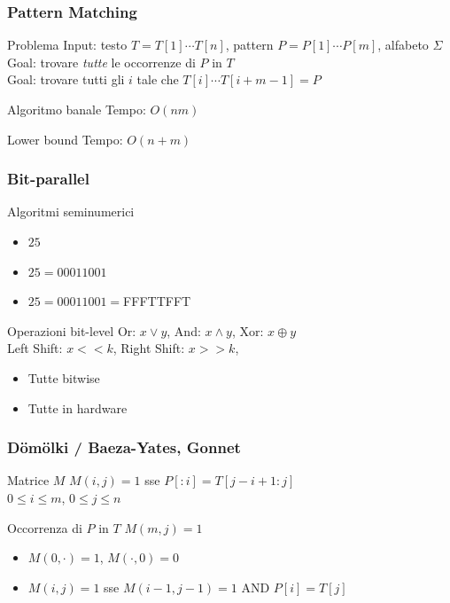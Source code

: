 \begin{frame}[fragile]
\frametitle{Pattern Matching}
\begin{block}{Problema}
\alert{Input}: testo $T=T[1]\cdots T[n]$, pattern $P=P[1]\cdots P[m]$, alfabeto $\Sigma$\\
\alert{Goal}: trovare \emph{tutte} le occorrenze di $P$ in $T$\\
\alert{Goal}: trovare tutti gli $i$ tale che $T[i]\cdots T[i+m-1]=P$
\end{block}
\begin{block}{Algoritmo banale}
\alert{Tempo}: $O(nm)$
\end{block}
\begin{block}{Lower bound}
\alert{Tempo}: $O(n+m)$
\end{block}
\end{frame}

\begin{frame}
\frametitle{Bit-parallel}
\begin{block}{Algoritmi seminumerici}
\begin{itemize}
\item
$25$
\item
$25=00011001$
\item
$25=00011001=$FFFTTFFT
\end{itemize}
\end{block}
\begin{block}{Operazioni bit-level}
\alert{Or}: $x\lor y$, \alert{And}: $x\land y$, \alert{Xor}: $x\oplus y$\\
\alert{Left Shift}: $x << k$, \alert{Right Shift}: $x >> k$,
\begin{itemize}
\item
Tutte bitwise
\item
Tutte in hardware
\end{itemize}
\end{block}
\end{frame}

\begin{frame}
\frametitle{D\"om\"olki / Baeza-Yates, Gonnet}
\begin{block}{Matrice $M$}
$M(i,j)=1$ sse $P[:i]=T[j-i+1:j]$\\
$0\le i\le m$, $0\le j\le n$
\end{block}
\begin{block}{Occorrenza di $P$ in $T$}
$M(m,j)=1$
\end{block}
\begin{itemize}
\item
$M(0,\cdot)=1$, $M(\cdot,0)=0$
\item
\alert{$M(i,j)=1$} sse $M(i-1, j-1)=1$ AND $P[i]=T[j]$
\end{itemize}
\end{frame}


